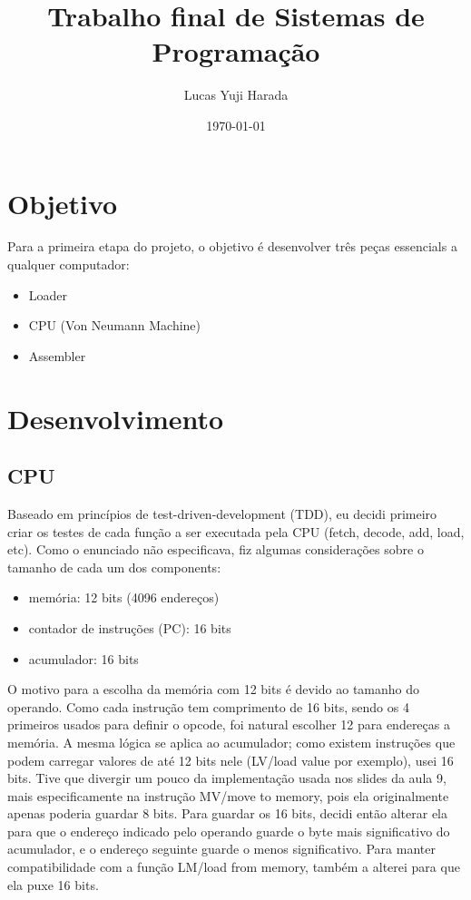 \documentclass[11pt]{article}
\author{Lucas Yuji Harada}
\date{\today}
\title{Trabalho final de Sistemas de Programação}
\begin{document}
\maketitle
\tableofcontents


\section{Objetivo}
\label{sec:orgc514dfc}
Para a primeira etapa do projeto, o objetivo é desenvolver três peças essencials a qualquer computador:
\begin{itemize}
\item Loader
\item CPU (Von Neumann Machine)
\item Assembler
\end{itemize}
\section{Desenvolvimento}
\label{sec:orgd9a08d0}
\subsection{CPU}
\label{sec:org1f4ee09}
Baseado em princípios de test-driven-development (TDD), eu decidi primeiro criar
os testes de cada função a ser executada pela CPU (fetch, decode, add, load,
etc). Como o enunciado não especificava, fiz algumas considerações sobre o tamanho de cada um dos components:
\begin{itemize}
\item memória: 12 bits (4096 endereços)
\item contador de instruções (PC): 16 bits
\item acumulador: 16 bits
\end{itemize}
O motivo para a escolha da memória com 12 bits é devido ao tamanho do operando.
Como cada instrução tem comprimento de 16 bits, sendo os 4 primeiros usados para
definir o opcode, foi natural escolher 12 para endereças a memória. A mesma
lógica se aplica ao acumulador; como existem instruções que podem carregar
valores de até 12 bits nele (LV/load value por exemplo), usei 16 bits. Tive que
divergir um pouco da implementação usada nos slides da aula 9, mais
especificamente na instrução MV/move to memory, pois ela originalmente apenas
poderia guardar 8 bits. Para guardar os 16 bits, decidi então alterar ela para
que o endereço indicado pelo operando guarde o byte mais significativo do
acumulador, e o endereço seguinte guarde o menos significativo. Para manter
compatibilidade com a função LM/load from memory, também a alterei para que ela
puxe 16 bits.
\end{document}

